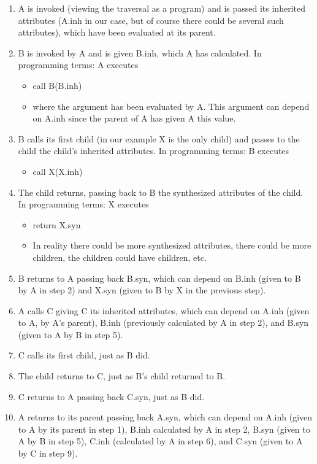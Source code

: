 \documentclass[a4paper,12pt]{article}
\begin{document}
\begin{enumerate}
\item A is invoked (viewing the traversal as a program) and is passed its inherited attributes (A.inh in our case, but of course there could be several such attributes), which have been evaluated at its parent.
\item B is invoked by A and is given B.inh, which A has calculated. In programming terms: A executes
\begin{itemize}
\item[ ] call B(B.inh)
\item[ ]  where the argument has been evaluated by A. This argument can depend on A.inh since the parent of A has given A this value.
\end{itemize}
\item B calls its first child (in our example X is the only child) and passes to the child the child's inherited attributes. In programming terms: B executes
\begin{itemize}
\item[ ] call X(X.inh)
\end{itemize}
\item The child returns, passing back to B the synthesized attributes of the child. In programming terms: X executes
\begin{itemize}
\item[ ] return X.syn
\item[ ] In reality there could be more synthesized attributes, there could be more children, the children could have children, etc.
\end{itemize}
\item B returns to A passing back B.syn, which can depend on B.inh (given to B by A in step 2) and X.syn (given to B by X in the previous step).
\item A calls C giving C its inherited attributes, which can depend on A.inh (given to A, by A's parent), B.inh (previously calculated by A in step 2), and B.syn (given to A by B in step 5). 
\item C calls its first child, just as B did.
\item The child returns to C, just as B's child returned to B.
\item C returns to A passing back C.syn, just as B did.
\item A returns to its parent passing back A.syn, which can depend on A.inh (given to A by its parent in step 1), B.inh calculated by A in step 2, B.syn (given to A by B in step 5), C.inh (calculated by A in step 6), and C.syn (given to A by C in step 9).
\end{enumerate}
\end{document}
